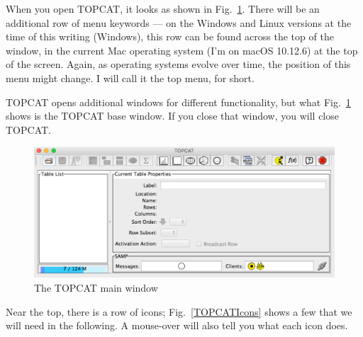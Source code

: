 \documentclass[twocolumn,apj]{openjournal}
\begin{document}
When you open TOPCAT, it looks as shown in Fig.~\ref{TOPCATMain}. There will be an additional row of menu keywords --- on the Windows and Linux versions at the time of this writing (Windows), this row can be found across the top of the window, in the current Mac operating system (I'm on macOS 10.12.6) at the top of the screen. Again, as operating systems evolve over time, the position of this menu might change. I will call it the top menu, for short.

TOPCAT opens additional windows for different functionality, but what Fig.~\ref{TOPCATMain} shows is the TOPCAT base window. If you close that window, you will close TOPCAT.
\begin{figure}[htbp]
\begin{center}
\includegraphics[width=\linewidth]{topcat-start.png}
\caption{The TOPCAT main window}
\label{TOPCATMain}
\end{center}
\end{figure}
Near the top, there is a row of icons; Fig.~\ref{TOPCATIcons} shows a few that we will need in the following. A mouse-over will also tell you what each icon does.
\end{document}
